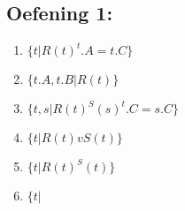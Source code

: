 \documentclass[../Oefenzitting5.tex]{subfiles}
\begin{document}
  \subsection{Oefening 1:}
    \begin{enumerate}
      \item
        $
          \{ t | R(t) ^ t.A = t.C \}
        $
      \item
        $
          \{ t.A, t.B | R(t) \}
        $
      \item
        $
          \{ t, s | R(t) ^ S(s) ^ t.C = s.C  \}
        $
      \item
        $
          \{ t | R(t) v S(t)  \}
        $
      \item
        $
          \{ t | R(t) ^ S(t) \}
        $
      \item
        $
          \{ t |
        $


    \end{enumerate}
\end{document}

